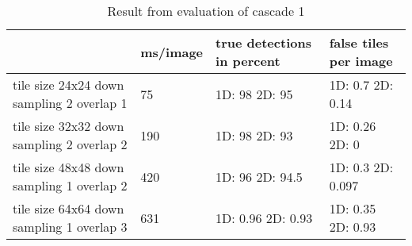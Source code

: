 \begin{table}[H]
\begin{center}
     \begin{tabular}{ | p{3cm} | l | p{3cm} | p{2cm}|}
     \hline
      	& ms/image & true detections in percent & false tiles \newline per image \\ \hline
   	 tile size 24x24 \newline down sampling 2 \newline overlap 1 
   	 & 75 & 1D: 98 \newline 2D: 95 & 1D: 0.7 \newline 2D: 0.14 				\\ \hline
     tile size 32x32 \newline down sampling 2 \newline overlap 2 
     & 190 & 1D: 98 \newline 2D: 93 & 1D: 0.26 \newline 2D: 0				\\ \hline
     tile size 48x48 \newline down sampling 1 \newline overlap 2 
     & 420    & 1D: 96 \newline 2D: 94.5 & 1D: 0.3 \newline 2D: 0.097
     \\ \hline
     tile size 64x64 \newline down sampling 1 \newline overlap 3 
     & 631 & 1D: 0.96 \newline 2D: 0.93 & 1D: 0.35 \newline 2D: 0.93		 \\ \hline
     \end{tabular}
\end{center}
\caption{Result from evaluation of cascade 1}
\end{table}

